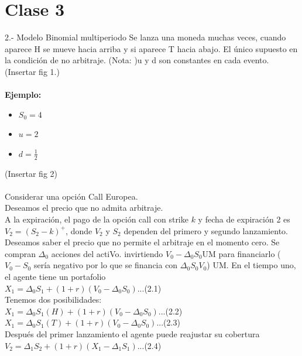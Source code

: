 \documentclass{article}
\begin{document}
        \section{Clase 3}
        2.- Modelo Binomial multiperiodo
        Se lanza una moneda muchas veces, cuando aparece H
        se mueve hacia arriba y si aparece T hacia abajo.
        El único supuesto en la condición de no arbitraje.
        (Nota: )u y d son constantes en cada evento.
        (Insertar fig 1.)
        \\
        \\
        \textbf{Ejemplo:}
        \begin{itemize}
            \item \(S_0 = 4\)
            \item \(u=2\)
            \item \(d=\frac{1}{2}\)
        \end{itemize}
        (Insertar fig 2)
        \\
        \\
        Considerar una opción Call Europea.
        \\
        Deseamos el precio que no admita arbitraje.
        \\
        A la expiración, el pago de la opción call
        con strike \(k\) y fecha de expiración 2 es
        \(V_2 = (S_2 - k)^+\), donde \(V_2\) y \(S_2\)
        dependen del primero y segundo lanzamiento.
        \\
        Deseamos saber el precio que no permite el
        arbitraje en el momento cero. Se compran
        \(\Delta_0\) acciones del actiVo. invirtiendo
        \(V_0 - \Delta_0 S_0\)UM para financiarlo
        (\(V_0 - S_0\) sería negativo por lo que se
        financia con \(\Delta_0 S_0 V_0\)) UM. En el
        tiempo uno, el agente tiene un portafolio
        \\
        \(X_1 = \Delta_0 S_1 + (1+r) (V_0 - \Delta_0 S_0)\)...(2.1)
        \\
        Tenemos dos posibilidades:
        \\
        \(X_1 = \Delta_0 S_1(H) + (1+r) (V_0 - \Delta_0 S_0)\)...(2.2)
        \\
        \(X_1 = \Delta_0 S_1(T) + (1+r) (V_0 - \Delta_0 S_0)\)...(2.3)
        \\
        Después del primer lanzamiento el agente puede reajustar su cobertura
        \\
        \(V_2 = \Delta_1 S_2 + (1+r) (X_1 - \Delta_1 S_1)\)...(2.4)
        \\
\end{document}
